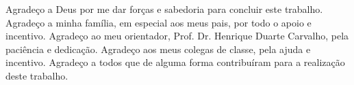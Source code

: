Agradeço a Deus por me dar forças e sabedoria para concluir este trabalho. Agradeço a minha família, em especial aos meus pais, por todo o apoio e incentivo. Agradeço ao meu orientador, Prof. Dr. Henrique Duarte Carvalho, pela paciência e dedicação. Agradeço aos meus colegas de classe, pela ajuda e incentivo. Agradeço a todos que de alguma forma contribuíram para a realização deste trabalho.